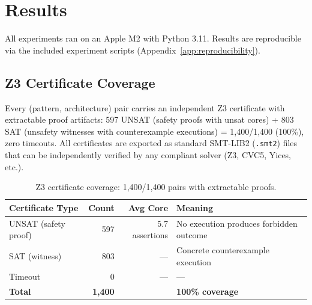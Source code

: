 \documentclass[11pt]{article}
\begin{document}
\section{Results}
\label{sec:results}

All experiments ran on an Apple M2 with Python 3.11.
Results are reproducible via the included experiment scripts
(Appendix~\ref{app:reproducibility}).

\subsection{Z3 Certificate Coverage}
\label{sec:z3-certs}

Every (pattern, architecture) pair carries an independent Z3
certificate with extractable proof artifacts:
597 UNSAT (safety proofs with unsat cores) + 803 SAT (unsafety
witnesses with counterexample executions) = 1{,}400/1{,}400
(100\%), zero timeouts.
All certificates are exported as standard SMT-LIB2 (\texttt{.smt2})
files that can be independently verified by any compliant solver
(Z3, CVC5, Yices, etc.).

\begin{table}[ht]
\centering
\caption{Z3 certificate coverage: 1{,}400/1{,}400 pairs with extractable proofs.}
\label{tab:z3-certs}
\small
\begin{tabular}{lrrl}
\toprule
\textbf{Certificate Type} & \textbf{Count} & \textbf{Avg Core} & \textbf{Meaning} \\
\midrule
UNSAT (safety proof)    & 597 & 5.7 assertions & No execution produces forbidden outcome \\
SAT (witness)    & 803 & --- & Concrete counterexample execution \\
Timeout           & 0   & --- & --- \\
\midrule
\textbf{Total}    & \textbf{1{,}400} & & \textbf{100\% coverage} \\
\bottomrule
\end{tabular}
\end{table}
\end{document}
